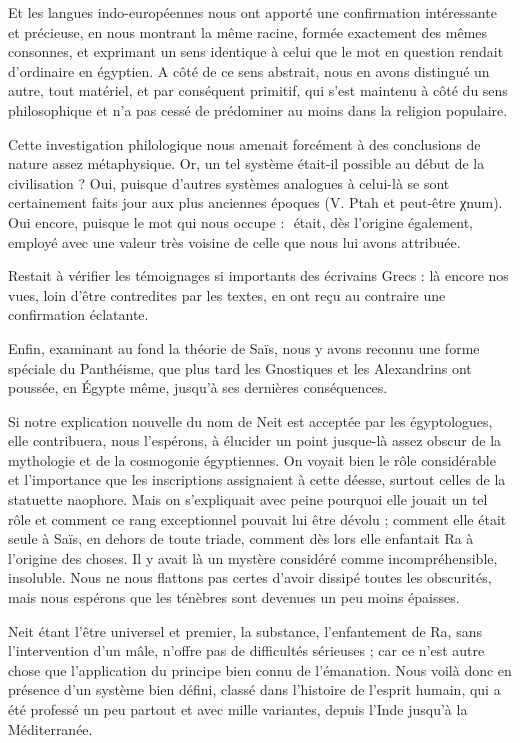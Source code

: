 \documentclass[a4paper, 11pt, oneside]{article}
\newcommand*\hieroAAAQ{}
\begin{document}
Et les langues indo-européennes nous ont apporté une confirmation intéressante et précieuse, en nous montrant la même racine, formée exactement des mêmes consonnes, et exprimant un sens identique à celui que le mot en question rendait d'ordinaire en égyptien. A côté de ce sens abstrait, nous en avons distingué un autre, tout matériel, et par conséquent primitif, qui s'est maintenu à côté du sens philosophique et n'a pas cessé de prédominer au moins dans la religion populaire.

Cette investigation philologique nous amenait forcément à des conclusions de nature assez métaphysique. Or, un tel système était-il possible au début de la civilisation ? Oui, puisque d'autres systèmes analogues à celui-là se sont certainement faits jour aux plus anciennes époques (V. Ptah et peut-être χnum). Oui encore, puisque le mot qui nous occupe : $\hieroAAAQ$ était, dès l'origine également, employé avec une valeur très voisine de celle que nous lui avons attribuée.

Restait à vérifier les témoignages si importants des écrivains Grecs : là encore nos vues, loin d'être contredites par les textes, en ont reçu au contraire une confirmation éclatante.

Enfin, examinant au fond la théorie de Saïs, nous y avons reconnu une forme spéciale du Panthéisme, que plus tard les Gnostiques et les Alexandrins ont poussée, en Égypte même, jusqu'à ses dernières conséquences.

Si notre explication nouvelle du nom de Neit est acceptée par les égyptologues, elle contribuera, nous l'espérons, à élucider un point jusque-là assez obscur de la mythologie et de la cosmogonie égyptiennes. On voyait bien le rôle considérable et l'importance que les inscriptions assignaient à cette déesse, surtout celles de la statuette naophore. Mais on s'expliquait avec peine pourquoi elle jouait un tel rôle et comment ce rang exceptionnel pouvait lui être dévolu ; comment elle était seule à Saïs, en dehors de toute triade, comment dès lors elle enfantait Ra à l'origine des choses. Il y avait là un mystère considéré comme incompréhensible, insoluble. Nous ne nous flattons pas certes d'avoir dissipé toutes les obscurités, mais nous espérons que les ténèbres sont devenues un peu moins épaisses.

Neit étant l'être universel et premier, la substance, l'enfantement de Ra, sans l'intervention d'un mâle, n'offre pas de difficultés sérieuses ; car ce n'est autre chose que l'application du principe bien connu de l'émanation. Nous voilà donc en présence d'un système bien défini, classé dans l'histoire de l'esprit humain, qui a été professé un peu partout et avec mille variantes, depuis l'Inde jusqu'à la Méditerranée.
\end{document}
